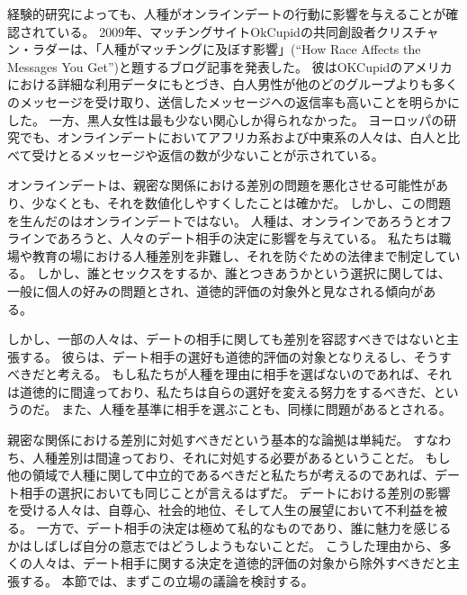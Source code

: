 \documentclass[paper=a4,book,openany]{jlreq}
\begin{document}
経験的研究によっても、人種がオンラインデートの行動に影響を与えることが確認されている。
2009年、マッチングサイトOkCupidの共同創設者クリスチャン・ラダーは、「人種がマッチングに及ぼす影響」(``How Race Affects the Messages You Get'')と題するブログ記事を発表した。
彼はOKCupidのアメリカにおける詳細な利用データにもとづき、白人男性が他のどのグループよりも多くのメッセージを受け取り、送信したメッセージへの返信率も高いことを明らかにした。
一方、黒人女性は最も少ない関心しか得られなかった\citep[pp.101-109]{rudder14:_datac}。
ヨーロッパの研究でも、オンラインデートにおいてアフリカ系および中東系の人々は、白人と比べて受けとるメッセージや返信の数が少ないことが示されている\citep[p.332]{potarca15:_racial_prefer_onlin_datin_europ_count}。

オンラインデートは、親密な関係における差別の問題を悪化させる可能性があり、少なくとも、それを数値化しやすくしたことは確かだ。
しかし、この問題を生んだのはオンラインデートではない。
人種は、オンラインであろうとオフラインであろうと、人々のデート相手の決定に影響を与えている。
私たちは職場や教育の場における人種差別を非難し、それを防ぐための法律まで制定している。
しかし、誰とセックスをするか、誰とつきあうかという選択に関しては、一般に個人の好みの問題とされ、道徳的評価の対象外と見なされる傾向がある。

しかし、一部の人々は、デートの相手に関しても差別を容認すべきではないと主張する。
彼らは、デート相手の選好も道徳的評価の対象となりえるし、そうすべきだと考える。
もし私たちが人種を理由に相手を選ばないのであれば、それは道徳的に間違っており、私たちは自らの選好を変える努力をするべきだ、というのだ。
また、人種を基準に相手を選ぶことも、同様に問題があるとされる。

親密な関係における差別に対処すべきだという基本的な論拠は単純だ。
すなわち、人種差別は間違っており、それに対処する必要があるということだ。
もし他の領域で人種に関して中立的であるべきだと私たちが考えるのであれば、デート相手の選択においても同じことが言えるはずだ。
デートにおける差別の影響を受ける人々は、自尊心、社会的地位、そして人生の展望において不利益を被る。
一方で、デート相手の決定は極めて私的なものであり、誰に魅力を感じるかはしばしば自分の意志ではどうしようもないことだ。
こうした理由から、多くの人々は、デート相手に関する決定を道徳的評価の対象から除外すべきだと主張する。
本節では、まずこの立場の議論を検討する。
\end{document}
